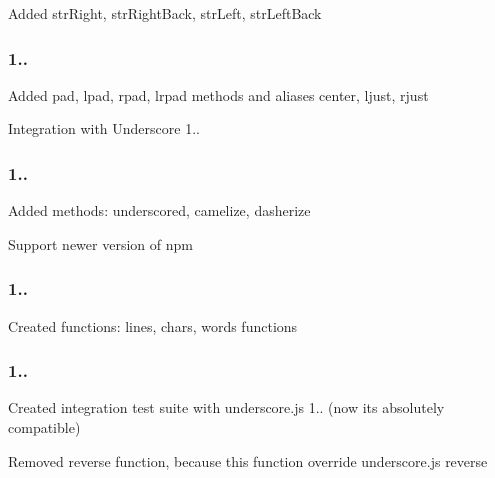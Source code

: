 \begin{DoxyItemize}
\item Added str\+Right, str\+Right\+Back, str\+Left, str\+Left\+Back
\end{DoxyItemize}

\subsubsection*{1..}


\begin{DoxyItemize}
\item Added pad, lpad, rpad, lrpad methods and aliases center, ljust, rjust
\item Integration with Underscore 1..
\end{DoxyItemize}

\subsubsection*{1..}


\begin{DoxyItemize}
\item Added methods\+: underscored, camelize, dasherize
\item Support newer version of npm
\end{DoxyItemize}

\subsubsection*{1..}


\begin{DoxyItemize}
\item Created functions\+: lines, chars, words functions
\end{DoxyItemize}

\subsubsection*{1..}


\begin{DoxyItemize}
\item Created integration test suite with underscore.\+js 1.. (now it\textquotesingle{}s absolutely compatible)
\item Removed \textquotesingle{}reverse\textquotesingle{} function, because this function override underscore.\+js \textquotesingle{}reverse\textquotesingle{}
\end{DoxyItemize}


